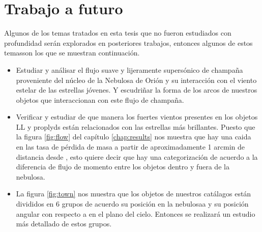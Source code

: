 \section{Trabajo a futuro}
\label{sec:future}

Algunos de los temas tratados en esta tesis que no fueron estudiados con profundidad serán explorados en posteriores trabajos, entonces algunos de estos temasson los que se muestran continuación.

\begin{itemize}
\item Estudiar y análisar el flujo suave y lijeramente supersónico de champaña proveniente del núcleo de la Nebulosa de Orión y su interacción con el viento estelar de las estrellas jóvenes. Y escudriñar la forma de los arcos de nuestros objetos que interaccionan con este flujo de champaña.
\item Verificar y estudiar de que manera los fuertes vientos presentes en los objetos LL y proplyds están relacionados con las estrellas más brillantes. Puesto que la figura \ref{fig:flow} del capítulo \ref{chap:results}  nos muestra que hay una caida  en las tasa de pérdida de masa a partir de aproximadamente 1 arcmin de distancia desde \thC{}, esto quiere decir que hay una categorización de acuerdo a la diferencia de flujo de momento entre los objetos dentro y fuera de la nebulosa.   
\item La figura \ref{fig:town} nos muestra que los objetos de nuestros catálagos están divididos en 6 grupos de acuerdo su posición en la nebulosaa y su posición angular con respecto a \thC{} en el plano del cielo. Entonces se realizará un estudio más detallado de estos grupos.
\end{itemize} 

%